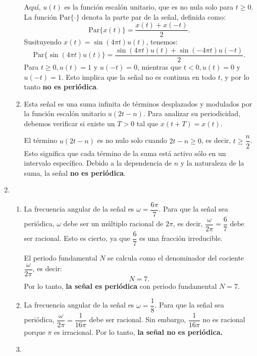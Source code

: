 \begin{enumerate}[label=\color{red}\textbf{\arabic*)}]
\begin{enumerate}[label=\color{red}\textbf{\alph*)}]
          Aquí, $u(t)$ es la función escalón unitario, que es no nula solo para $t\ge 0$. La función $\mathrm{Par}\{\cdot \} $ denota la parte par de la señal, definida como: \[
          \mathrm{Par}\{x(t)\} =\dfrac{x(t)+x(-t)}{2}.
          \] 
          Susituyendo $x(t)=\sin(4\pi t)u(t)$, tenemos: \[
          \mathrm{Par}\{\sin(4\pi t)u(t)\} =\dfrac{\sin(4\pi t)u(t)+\sin(-4\pi t)u(-t)}{2}.
          \] 
          Para $t\ge 0,u(t)=1$ y $u(-t)=0$, mientras que  $t<0,u(t)=0$ y $u(-t)=1$. Esto implica que la señal no es continua en todo  $t$, y por lo tanto  \textbf{no es periódica}. 

      \item {} 

          Esta señal es una suma infinita de términos desplazados y modulados por la función escalón unitario $u(2t-n)$. Para analizar su periodicidad, debemos verificar si existe un $T>0$ tal que $x(t+T)=x(t)$.

          El término  $u(2t-n)$ es no nulo solo cuando  $2t-n\ge 0$, es decir, $t\ge \dfrac{n}{2}$. Esto significa que cada término de la suma está activo sólo en un intervalo específico. Debido a la dependencia de $n$ y la naturaleza de la suma, la señal \textbf{no es periódica}. 
    \end{enumerate}
\item {}
    \begin{enumerate}[label=\color{red}\textbf{\alph*)}]
        \item {} 

            La frecuencia angular de la señal es $\omega=\dfrac{6\pi}{7}$. Para que la señal sea periódica, $\omega$ debe ser un múltiplo racional de $2\pi$, es decir, $\dfrac{\omega}{2\pi}=\dfrac{6}{7}$ debe ser racional. Esto es cierto, ya que $\dfrac{6}{7}$ es una fracción irreducible.

            El periodo fundamental $N$ se calcula como el denominador del cociente $\dfrac{\omega}{2\pi}$, es decir: \[
            N=7.
            \] Por lo tanto, \textbf{la señal es periódica} con periodo fundamental $N=7$.

        \item {} 

            La frecuencia angular de la señal es $\omega=\dfrac{1}{8}$. Para que la señal sea periódica, $\dfrac{\omega}{2\pi}=\dfrac{1}{16\pi}$ debe ser racional. Sin embargo, $\dfrac{1}{16\pi}$ no es racional porque $\pi$ es irracional. Por lo tanto, \textbf{la señal no es periódica.} 
        \item {} 


\end{enumerate}
\end{enumerate}
